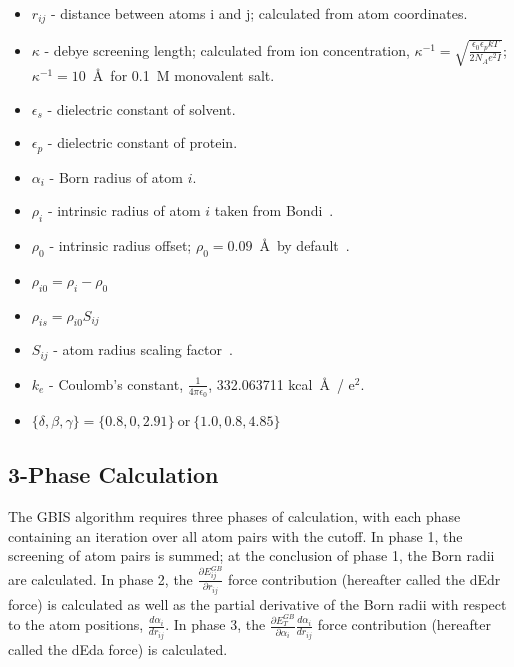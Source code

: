 \begin{itemize}
\item $r_{ij}$ - distance between atoms i and j; calculated from atom coordinates.
\item $\kappa$ - debye screening length; calculated from ion concentration, $\kappa^{-1} = \sqrt{\frac{\epsilon_0 \epsilon_p k T}{2 N_A e^2 I}}$; $\kappa^{-1} = 10$~\AA~for 0.1~M monovalent salt.
\item $\epsilon_s$ - dielectric constant of solvent.
\item $\epsilon_p$ - dielectric constant of protein.
\item $\alpha_i$ - Born radius of atom $i$.
\item $\rho_i$ - intrinsic radius of atom $i$ taken from Bondi~\cite{BOND64}.
\item $\rho_0$ - intrinsic radius offset; $\rho_0 = 0.09$~\AA~by default~\cite{ONUF04}.
\item $\rho_{i0} = \rho_i - \rho_0$
\item $\rho_{is} = \rho_{i0} S_{ij}$
\item $S_{ij}$ - atom radius scaling factor~\cite{HAWK96,SRIN99}.
\item $k_e$ - Coulomb's constant, $\frac{1}{4 \pi \epsilon_0}$, 332.063711 kcal~\AA~/ e$^2$.
\item $\{\delta, \beta, \gamma\} = \{0.8, 0, 2.91\}~\textrm{or}~\{1.0, 0.8, 4.85\}$~\cite{ONUF04}
\end{itemize}


\subsection{3-Phase Calculation}

The GBIS algorithm requires three phases of calculation, with each phase containing an iteration over all atom pairs with the cutoff.
In phase 1, the screening of atom pairs is summed; at the conclusion of phase 1, the Born radii are calculated.
In phase 2, the $\frac{\partial E_{ij}^{GB}}{\partial r_{ij}}$ force contribution (hereafter called the dEdr force) is calculated as well as the partial derivative of the Born radii with respect to the atom positions, $\frac{d \alpha_i}{d r_{ij}}$.
In phase 3, the $\frac{\partial E_T^{GB}}{\partial \alpha_i}\frac{d \alpha_i}{d r_{ij}}$ force contribution (hereafter called the dEda force) is calculated.


